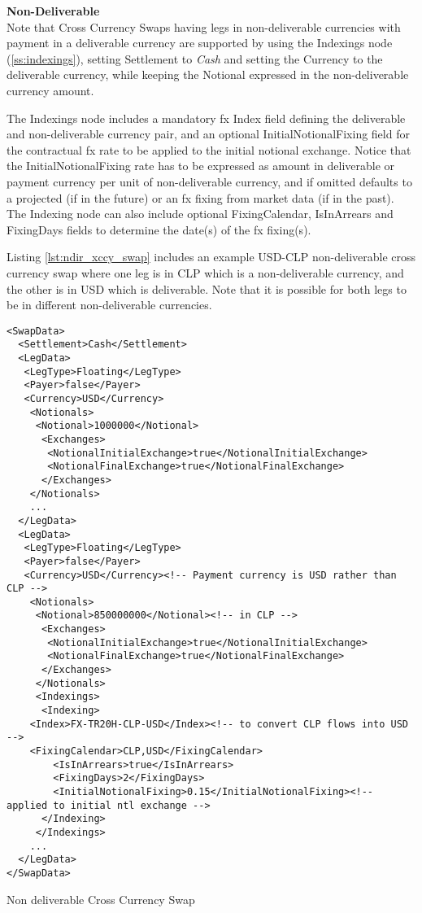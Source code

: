 {\bf Non-Deliverable}\\
Note that Cross Currency Swaps having legs in non-deliverable currencies with payment in a deliverable currency are supported by using the Indexings node (\ref{ss:indexings}), setting Settlement  to \emph{Cash} and setting the Currency to the deliverable currency, while keeping the Notional expressed in the non-deliverable currency amount. 

The Indexings node includes a mandatory fx Index field defining the deliverable and non-deliverable currency pair, and an optional InitialNotionalFixing field for the contractual fx rate to be applied to the initial notional exchange. Notice that the InitialNotionalFixing rate has to be expressed as amount in deliverable or payment currency per unit of non-deliverable currency, and if omitted defaults to a projected (if in the future) or an fx fixing from market data (if in the past).  The Indexing node can also include optional FixingCalendar, IsInArrears and FixingDays fields to determine the date(s) of the fx fixing(s).

 Listing \ref{lst:ndir_xccy_swap} includes an example USD-CLP non-deliverable cross currency swap where one leg is in CLP which is a non-deliverable
currency, and the other is in USD which is deliverable. Note that it is possible for both legs to be in different non-deliverable currencies.

\begin{listing}[H]
\begin{verbatim}
<SwapData>
  <Settlement>Cash</Settlement>
  <LegData>
   <LegType>Floating</LegType>
   <Payer>false</Payer>  
   <Currency>USD</Currency>
    <Notionals>
     <Notional>1000000</Notional>
      <Exchanges>
       <NotionalInitialExchange>true</NotionalInitialExchange>
       <NotionalFinalExchange>true</NotionalFinalExchange>
      </Exchanges>
    </Notionals>
    ...
  </LegData>
  <LegData>
   <LegType>Floating</LegType>
   <Payer>false</Payer>  
   <Currency>USD</Currency><!-- Payment currency is USD rather than CLP -->
    <Notionals>
     <Notional>850000000</Notional><!-- in CLP -->
      <Exchanges>
       <NotionalInitialExchange>true</NotionalInitialExchange>
       <NotionalFinalExchange>true</NotionalFinalExchange>
      </Exchanges>
     </Notionals>
     <Indexings>
      <Indexing>
	<Index>FX-TR20H-CLP-USD</Index><!-- to convert CLP flows into USD -->
	<FixingCalendar>CLP,USD</FixingCalendar>
        <IsInArrears>true</IsInArrears>
        <FixingDays>2</FixingDays>
        <InitialNotionalFixing>0.15</InitialNotionalFixing><!-- applied to initial ntl exchange -->
      </Indexing>
     </Indexings>     
    ...
  </LegData>
</SwapData>
\end{verbatim}
\caption{Non deliverable Cross Currency Swap}
\label{lst:ndir_xccy_swap}
\end{listing}
